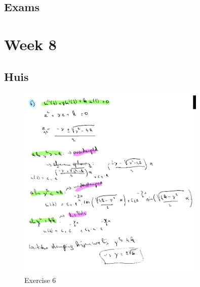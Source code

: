 \documentclass[a4paper]{report}
\begin{document}
\subsection{Exams}







\section{Week 8}

\subsection{Huis}

\begin{figure}[H]
	\centering
	\includegraphics[width=0.8\textwidth]{assets/exercise_6_huis_8.png}
	\caption{Exercise 6}
	\label{fig:exercise_6_huis_8}
\end{figure}


\end{document}

